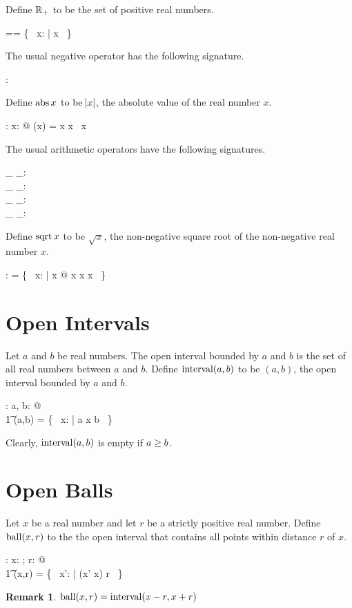 \documentclass[11pt, oneside]{article}
\newtheorem*{remark}{Remark}
\begin{document}
Define $\mathbb{R}_{+}$ to be the set of positive real numbers.
\begin{zed}
	\Rpos == \{~ x: \R | x \gtR \zeroR ~\}
\end{zed}

The usual negative operator has the following signature.
\begin{axdef}
	\negR: \R \fun \R
\end{axdef}

Define $\operatorname{abs}{x}$ to be $\abs{x}$, the absolute value of the real number $x$.
\begin{axdef}
	\absR: \R \fun \R
\where
	\forall x: \R @ \absR(x) = \IF x \geR \zeroR \THEN x \ELSE \negR~x
\end{axdef}

The usual arithmetic operators have the following signatures.
\begin{axdef}
	\_ \addR \_: \R \cross \R \fun \R \\
	\_ \subR \_: \R \cross \R \fun \R \\
	\_ \mulR \_: \R \cross \R \fun \R \\
	\_ \divR \_: \R \cross \Rnz \fun \R
\end{axdef}

Define $\operatorname{sqrt}{x}$ to be $\sqrt{x}$, the non-negative square root of the non-negative real number $x$.
\begin{axdef}
	\sqrtR: \R \pfun \R
\where
	\sqrtR = \{~ x: \R | x \geR \zeroR @ x \mulR x \mapsto x ~\}
\end{axdef}

\section{Open Intervals}

Let $a$ and $b$ be real numbers.
The open interval bounded by $a$ and $b$ is the set of all real numbers between $a$ and $b$.
Define $\operatorname{interval}(a,b)$ to be $(a,b)$, the open interval bounded by $a$ and $b$. 

\begin{axdef}
	\intervalRR: \R \cross \R \fun \power \R
\where
	\forall a, b: \R @ \\
	\t1	\intervalRR(a,b) = \{~ x: \R | a \ltR x \ltR b ~\}
\end{axdef}
Clearly, $\operatorname{interval}(a,b)$ is empty if $a \mathrel{\geq} b$.

\section{Open Balls}
Let $x$ be a real number and let $r$ be a strictly positive real number.
Define $\operatorname{ball}(x,r)$ to the the open interval that contains all points within distance $r$ of $x$.
\begin{axdef}
	\ballRR: \R \cross \Rpos \fun \power \R
\where
	\forall x: \R; r: \Rpos @ \\
	\t1	\ballRR(x,r) = \{~ x': \R | \absR(x' \subR x) \ltR r ~\}
\end{axdef}
\begin{remark}
$\operatorname{ball}(x,r) = \operatorname{interval}(x-r, x+r)$
\end{remark}
\end{document}

